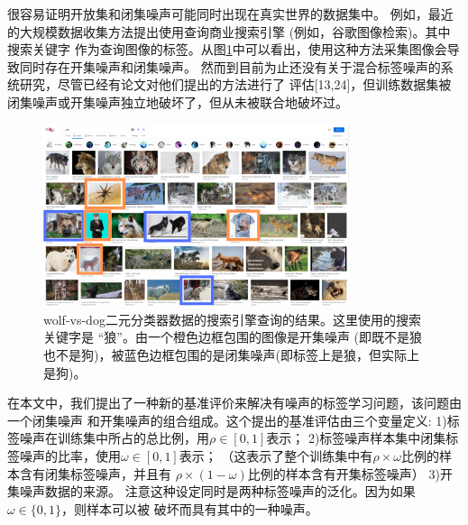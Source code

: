 \documentclass[12pt]{article}
\begin{document}
很容易证明开放集和闭集噪声可能同时出现在真实世界的数据集中。
例如，最近的大规模数据收集方法提出使用查询商业搜索引擎 (例如，谷歌图像检索)。其中搜索关键字
作为查询图像的标签。从图\ref{fig1}中可以看出，使用这种方法采集图像会导致同时存在开集噪声和闭集噪声。
然而到目前为止还没有关于混合标签噪声的系统研究，尽管已经有论文对他们提出的方法进行了
评估[13,24]，但训练数据集被闭集噪声或开集噪声独立地破坏了，但从未被联合地破坏过。

\begin{figure}[h]
    \centering
    \includegraphics[width=0.8\textwidth]{images/wolfsearch.png}
    \caption{wolf-vs-dog二元分类器数据的搜索引擎查询的结果。这里使用的搜索关键字是 “狼”。由一个橙色边框包围的图像是开集噪声 (即既不是狼也不是狗)，被蓝色边框包围的是闭集噪声(即标签上是狼，但实际上是狗)。}
    \label{fig1}
\end{figure}

在本文中，我们提出了一种新的基准评价来解决有噪声的标签学习问题，该问题由一个闭集噪声
和开集噪声的组合组成。这个提出的基准评估由三个变量定义:
1)标签噪声在训练集中所占的总比例，用$\rho \in [0,1]$表示；
2)标签噪声样本集中闭集标签噪声的比率，使用$\omega \in [0,1]$表示；
（这表示了整个训练集中有$\rho \times \omega $比例的样本含有闭集标签噪声，并且有
$\rho \times (1 - \omega) $比例的样本含有开集标签噪声）
3)开集噪声数据的来源。
注意这种设定同时是两种标签噪声的泛化。因为如果 $\omega \in \{0,1\}$，则样本可以被
破坏而具有其中的一种噪声。
\end{document}
